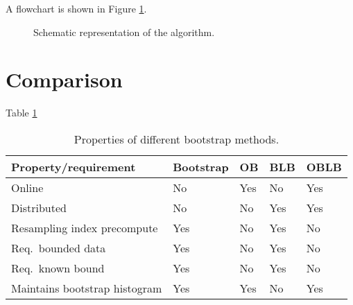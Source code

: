 \documentclass{article}
\begin{document}
A flowchart is shown in Figure \ref{oblbflowchart}.

\begin{figure}[tbp]
\centering
\label{oblbflowchart}
\caption{Schematic representation of the algorithm.}
\end{figure}


\section{Comparison}

Table \ref{bootcomp}

\begin{table}[h]
\caption{Properties of different bootstrap methods.}
\label{bootcomp}
\begin{tabular}{lllll}
\hline
\hline
Property/requirement & Bootstrap & OB & BLB & OBLB \\
\hline
Online & No & Yes & No & Yes \\ 
Distributed & No & No & Yes &  Yes \\ 
Resampling index precompute & Yes & No & Yes & No \\ 
Req.\ bounded data & Yes & No & Yes & No \\ 
Req.\ known bound & Yes & No & Yes & No \\ 
Maintains bootstrap histogram & Yes & Yes & No & Yes \\
\hline
\hline
\end{tabular}
\end{table}




{}

\end{document}
